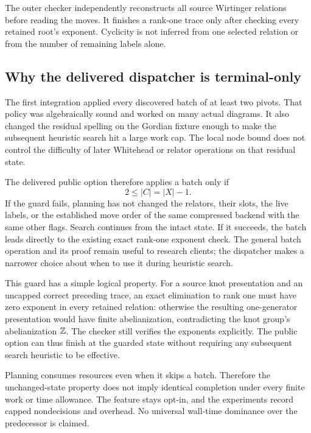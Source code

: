 The outer checker independently reconstructs all source Wirtinger relations
before reading the moves. It finishes a rank-one trace only after checking
every retained root's exponent. Cyclicity is not inferred from one selected
relation or from the number of remaining labels alone.

\subsection{Why the delivered dispatcher is terminal-only}

The first integration applied every discovered batch of at least two
pivots. That policy was algebraically sound and worked on many actual
diagrams. It also changed the residual spelling on the Gordian fixture
enough to make the subsequent heuristic search hit a large work cap.
The local node bound does not control the difficulty of later Whitehead
or relator operations on that residual state.

The delivered public option therefore applies a batch only if
\begin{equation}
 2\leq |C|=|X|-1.
 \label{eq:terminal-guard}
\end{equation}
If the guard fails, planning has not changed the relators, their slots,
the live labels, or the established move order of the same compressed
backend with the same other flags. Search continues from the
intact state. If it succeeds, the batch leads directly to the existing
exact rank-one exponent check. The general batch operation and its proof
remain useful to research clients; the dispatcher makes a narrower choice
about when to use it during heuristic search.

This guard has a simple logical property. For a source knot presentation
and an uncapped correct preceding trace, an exact elimination to rank one
must have zero exponent in every retained relation: otherwise the resulting
one-generator presentation would have finite abelianization, contradicting
the knot group's abelianization $\mathbb Z$. The checker still verifies the
exponents explicitly. The public option can thus finish at the guarded
state without requiring any subsequent search heuristic to be effective.

Planning consumes resources even when it skips a batch. Therefore the
unchanged-state property does not imply identical completion under every
finite work or time allowance. The feature stays opt-in, and the experiments
record capped nondecisions and overhead. No universal wall-time dominance
over the predecessor is claimed.

